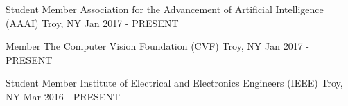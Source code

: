 

\begin{cventries}


  \cventryshort
    {Student Member} %
    {Association for the Advancement of Artificial Intelligence (AAAI)} %
    {Troy, NY} %
    {Jan 2017 - PRESENT} %

  \cventryshort
    {Member} %
    {The Computer Vision Foundation (CVF)} %
    {Troy, NY} %
    {Jan 2017 - PRESENT} %

  \cventryshort
    {Student Member} %
    {Institute of Electrical and Electronics Engineers (IEEE)} %
    {Troy, NY} %
    {Mar 2016 - PRESENT} %




\end{cventries}
